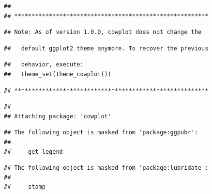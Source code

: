 \documentclass[
]{article}
\begin{document}
\begin{verbatim}
## 
## ********************************************************
\end{verbatim}

\begin{verbatim}
## Note: As of version 1.0.0, cowplot does not change the
\end{verbatim}

\begin{verbatim}
##   default ggplot2 theme anymore. To recover the previous
\end{verbatim}

\begin{verbatim}
##   behavior, execute:
##   theme_set(theme_cowplot())
\end{verbatim}

\begin{verbatim}
## ********************************************************
\end{verbatim}

\begin{verbatim}
## 
## Attaching package: 'cowplot'
\end{verbatim}

\begin{verbatim}
## The following object is masked from 'package:ggpubr':
## 
##     get_legend
\end{verbatim}

\begin{verbatim}
## The following object is masked from 'package:lubridate':
## 
##     stamp
\end{verbatim}
\end{document}
